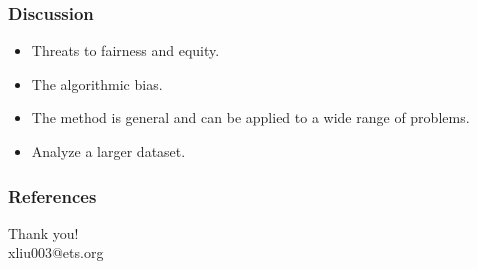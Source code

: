 \documentclass{beamer}
\begin{document}
	\begin{frame}[t]\frametitle{Discussion}
		\begin{itemize}
			\item Threats to fairness and equity.
			\item The algorithmic bias.
			\item The method is general and can be applied to a wide range of
			problems.
			\item Analyze a larger dataset.
		\end{itemize}
	\end{frame}

	\begin{frame}\frametitle{References}
		\printbibliography
	\end{frame}

	\begin{frame}[t]
		\begin{center}
		\vfill
	    \huge Thank you!\\
	    \huge xliu003@ets.org
	  \vfill
	  \end{center}
	\end{frame}
\end{document}
